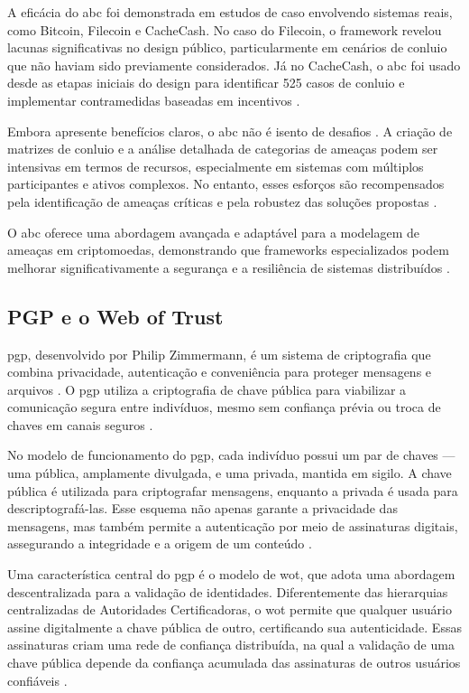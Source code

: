 A eficácia do \gls{abc} foi demonstrada em estudos de caso envolvendo
sistemas reais, como Bitcoin, Filecoin e CacheCash. No caso do
Filecoin, o framework revelou lacunas significativas no design
público, particularmente em cenários de conluio que não haviam sido
previamente considerados. Já no CacheCash, o \gls{abc} foi usado desde as
etapas iniciais do design para identificar 525 casos de conluio e
implementar contramedidas baseadas em incentivos \cite{AbcCrypto}.

Embora apresente benefícios claros, o \gls{abc} não é isento de desafios \cite{AbcCrypto}.
A criação de matrizes de conluio e a análise detalhada de categorias de
ameaças podem ser intensivas em termos de recursos, especialmente em
sistemas com múltiplos participantes e ativos complexos. No entanto,
esses esforços são recompensados pela identificação de ameaças
críticas e pela robustez das soluções propostas \cite{AbcCrypto}.

O \gls{abc} oferece uma abordagem avançada e adaptável para a modelagem de
ameaças em criptomoedas, demonstrando que frameworks especializados
podem melhorar significativamente a segurança e a resiliência de
sistemas distribuídos \cite{AbcCrypto}.


\subsection{PGP e o Web of Trust}
\label{subsec:pgp_web_of_trust}

\gls{pgp}, desenvolvido por Philip Zimmermann, é um sistema de
criptografia que combina privacidade, autenticação e conveniência para proteger
mensagens e arquivos \cite{Pgp}. O \gls{pgp} utiliza a criptografia de chave pública para
viabilizar a comunicação segura entre indivíduos, mesmo sem confiança prévia ou
troca de chaves em canais seguros \cite{Pgp}.

No modelo de funcionamento do \gls{pgp}, cada indivíduo possui um par de chaves — uma
pública, amplamente divulgada, e uma privada, mantida em sigilo. A chave pública
é utilizada para criptografar mensagens, enquanto a privada é usada para
descriptografá-las. Esse esquema não apenas garante a privacidade das mensagens,
mas também permite a autenticação por meio de assinaturas digitais, assegurando
a integridade e a origem de um conteúdo \cite{Pgp}.

Uma característica central do \gls{pgp} é o modelo de \gls{wot}, que adota
uma abordagem descentralizada para a validação de identidades. Diferentemente
das hierarquias centralizadas de Autoridades Certificadoras, o \gls{wot} permite
que qualquer usuário assine digitalmente a chave pública de outro, certificando
sua autenticidade. Essas assinaturas criam uma rede de confiança distribuída, na
qual a validação de uma chave pública depende da confiança acumulada das
assinaturas de outros usuários confiáveis \cite{Pgp}.

